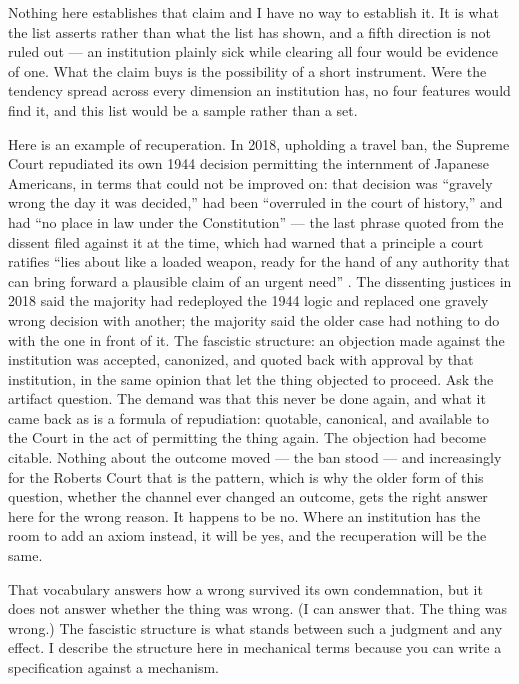 Nothing here establishes that claim and I have no way to establish it. It is what the list asserts rather than what the list has shown, and a fifth direction is not ruled out — an institution plainly sick while clearing all four would be evidence of one. What the claim buys is the possibility of a short instrument. Were the tendency spread across every dimension an institution has, no four features would find it, and this list would be a sample rather than a set.

Here is an example of recuperation. In 2018, upholding a travel ban, the Supreme Court repudiated its own 1944 decision permitting the internment of Japanese Americans, in terms that could not be improved on: that decision was “gravely wrong the day it was decided,” had been “overruled in the court of history,” and had “no place in law under the Constitution” — the last phrase quoted from the dissent filed against it at the time, which had warned that a principle a court ratifies “lies about like a loaded weapon, ready for the hand of any authority that can bring forward a plausible claim of an urgent need” \autocite{trump2018hawaii,korematsu1944}. The dissenting justices in 2018 said the majority had redeployed the 1944 logic and replaced one gravely wrong decision with another; the majority said the older case had nothing to do with the one in front of it. The fascistic structure: an objection made against the institution was accepted, canonized, and quoted back with approval by that institution, in the same opinion that let the thing objected to proceed. Ask the artifact question. The demand was that this never be done again, and what it came back as is a formula of repudiation: quotable, canonical, and available to the Court in the act of permitting the thing again. The objection had become citable. Nothing about the outcome moved — the ban stood — and increasingly for the Roberts Court that is the pattern, which is why the older form of this question, whether the channel ever changed an outcome, gets the right answer here for the wrong reason. It happens to be no. Where an institution has the room to add an axiom instead, it will be yes, and the recuperation will be the same.

That vocabulary answers how a wrong survived its own condemnation, but it does not answer whether the thing was wrong. (I can answer that. The thing was wrong.) The fascistic structure is what stands between such a judgment and any effect. I describe the structure here in mechanical terms because you can write a specification against a mechanism.

